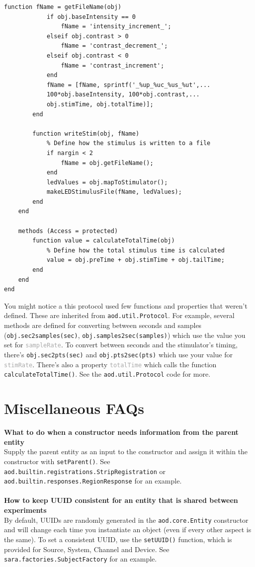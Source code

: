 \documentclass[10pt]{exam}
\newcommand\aodclass[1]{\textcolor{codeblue}{\texttt{#1}}}
\newcommand\aodprop[1]{\textcolor{darkgray}{\texttt{#1}}}
\newcommand\aodfcn[1]{\textcolor{darkteal}{\texttt{#1}}}
\begin{document}
\begin{lstlisting}[style=Matlab-editor, basicstyle=\mlttfamily\footnotesize]
		function fName = getFileName(obj)
			if obj.baseIntensity == 0
				fName = 'intensity_increment_';
			elseif obj.contrast > 0
				fName = 'contrast_decrement_';
			elseif obj.contrast < 0
				fName = 'contrast_increment';
			end
			fName = [fName, sprintf('_%up_%uc_%us_%ut',...
			100*obj.baseIntensity, 100*obj.contrast,... 
			obj.stimTime, obj.totalTime)];
		end
			
		function writeStim(obj, fName)
			% Define how the stimulus is written to a file
			if nargin < 2
				fName = obj.getFileName();
			end
			ledValues = obj.mapToStimulator();
			makeLEDStimulusFile(fName, ledValues);
		end
	end

	methods (Access = protected)
		function value = calculateTotalTime(obj)
			% Define how the total stimulus time is calculated
			value = obj.preTime + obj.stimTime + obj.tailTime;
		end
	end
end
		\end{lstlisting}
	\noindent 
	You might notice a this protocol used few functions and properties that weren't defined. These are inherited from \aodclass{aod.util.Protocol}. For example, several methods are defined for converting between seconds and samples (\aodfcn{obj.sec2samples(sec)}, \aodfcn{obj.samples2sec(samples)}) which use the value you set for \aodprop{sampleRate}. To convert between seconds and the stimulator's timing, there's \aodfcn{obj.sec2pts(sec)} and \aodfcn{obj.pts2sec(pts)} which use your value for \aodprop{stimRate}. There's also a property \aodprop{totalTime} which calls the function \aodfcn{calculateTotalTime()}. See the \aodclass{aod.util.Protocol} code for more.	

\section{Miscellaneous FAQs}
	\label{section:Misc}
	\noindent\textbf{What to do when a constructor needs information from the parent entity}\\
	Supply the parent entity as an input to the constructor and assign it within the constructor with \aodfcn{setParent()}. See \aodclass{aod.builtin.registrations.StripRegistration} or \aodclass{aod.builtin.responses.RegionResponse} for an example.
	\\$\quad$\\
	\noindent\textbf{How to keep UUID consistent for an entity that is shared between experiments}\\
	By default, UUIDs are randomly generated in the \aodclass{aod.core.Entity} constructor and will change each time you instantiate an object (even if every other aspect is the same). To set a consistent UUID, use the \aodfcn{setUUID()} function, which is provided for Source, System, Channel and Device. See \aodclass{sara.factories.SubjectFactory} for an example.
	
\end{document}
